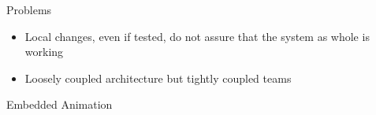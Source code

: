

\begin{frame}{Problems}
\begin{itemize}[<+->]
\item Local changes, even if tested, do not assure that the system as whole is working
\item Loosely coupled architecture but tightly coupled teams
\end{itemize}
\end{frame}

\begin{frame}{Embedded Animation}
\end{frame}
